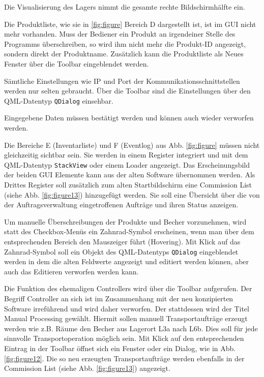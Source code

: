 Die Visualisierung des Lagers nimmt die gesamte rechte Bildschirmhälfte ein.

Die Produktliste, wie sie in \ref{fig:figure} Bereich \glqq D\grqq{} dargestellt ist, ist im GUI nicht mehr vorhanden.
Muss der Bediener ein Produkt an irgendeiner Stelle des Programms überschreiben, so wird ihm nicht mehr die Produkt-ID
angezeigt, sondern direkt der Produktname.
Zusätzlich kann die Produktliste als Neues Fenster über die Toolbar eingeblendet werden.

Sämtliche Einstellungen wie IP und Port der Kommunikationsschnittstellen werden nur selten gebraucht.
Über die Toolbar sind die Einstellungen über den QML-Datentyp \verb|QDialog| einsehbar.

Eingegebene Daten müssen bestätigt werden und können auch wieder verworfen werden.

Die Bereiche \glqq E\grqq{} (Inventarliste) und \glqq F\grqq{} (Eventlog) aus Abb. \ref{fig:figure} müssen nicht
gleichzeitig sichtbar sein. 
Sie werden in einem Register integriert und mit dem QML-Datentyp \verb|StackView| oder einem Loader angezeigt.
Das Erscheinungsbild der beiden GUI Elemente kann aus der alten Software übernommen werden.
Als Drittes Register soll zusätzlich zum alten Startbildschirm eine Commission List (siehe Abb. \ref{fig:figure13}) hinzugefügt werden.
Sie soll eine Übersicht über die von der Auftragsverwaltung eingetroffenen Aufträge und ihren Status anzeigen.

Um manuelle Überschreibungen der Produkte und Becher vorzunehmen, wird statt des Checkbox-Menüs ein Zahnrad-Symbol erscheinen,
wenn man über dem entsprechenden Bereich den Mauszeiger führt (Hovering).
Mit Klick auf das Zahnrad-Symbol soll ein Objekt des QML-Datentyps \verb|QDialog| eingeblendet werden in dem die alten
Feldwerte angezeigt und editiert werden können, aber auch das Editieren verworfen werden kann.


Die Funktion des ehemaligen Controllers wird über die Toolbar aufgerufen.
Der Begriff \glqq Controller\grqq{} an sich ist im Zusammenhang mit der neu konzipierten Software irreführend und wird daher verworfen.
Der stattdessen wird der Titel \glqq Manual Processing\grqq{} gewählt.
Hiermit sollen manuell Transportaufträge erzeugt werden wie z.B. \glqq Räume den Becher aus Lagerort L3a nach L6b\grqq{}.
Dies soll für jede sinnvolle Transportoperation möglich sein.
Mit Klick auf den entsprechenden Eintrag in der Toolbar öffnet sich ein Fenster oder ein Dialog, wie in Abb.\ref{fig:figure12}.
Die so neu erzeugten Transportaufträge werden ebenfalls in der Commission List (siehe Abb. \ref{fig:figure13}) angezeigt.


